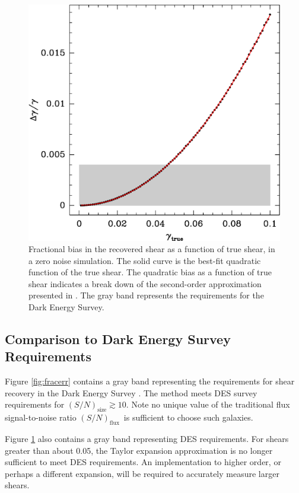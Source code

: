 \documentclass[12pt,preprint]{aastex}
\newcommand{\Tsn}{$(S/N)_{\textrm{size}}$}
\newcommand{\fsn}{$(S/N)_{\textrm{flux}}$}
\begin{document}
\begin{figure}[t] \centering
 \centering 
 \includegraphics[scale=0.6]{figures/fracerr-vs-shear.eps}

 \caption{Fractional bias in the recovered shear as a function of true shear,
     in a zero noise simulation.  The solid curve is the best-fit quadratic
     function of the true shear.  The quadratic bias as a function of true
     shear indicates a break down of the second-order approximation presented
     in \cite{ba13}. The gray band represents the requirements for the Dark
 Energy Survey. \label{fig:nonoise}}

\end{figure}

\subsection{Comparison to Dark Energy Survey Requirements} \label{sec:desreq}

Figure \ref{fig:fracerr} contains a gray band representing the requirements
for shear recovery in the Dark Energy Survey \citep[][DES]{DESWhitePaper}.  The
method meets DES survey requirements for \Tsn$ \gtrsim 10$.  Note no unique
value of the traditional flux signal-to-noise ratio \fsn\ is sufficient to
choose such galaxies.

Figure \ref{fig:nonoise} also contains a gray band representing DES
requirements.  For shears greater than about 0.05, the Taylor expansion
approximation is no longer sufficient to meet DES requirements.  An
implementation to higher order, or perhaps a different expansion, will be
required to accurately measure larger shears.
\end{document}
